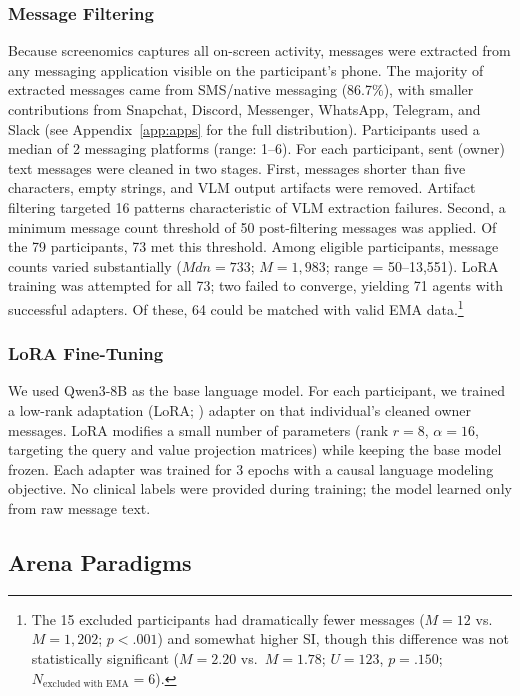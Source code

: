 \documentclass[review,12pt,authoryear]{elsarticle}
\begin{document}
\subsubsection{Message Filtering}

Because screenomics captures all on-screen activity, messages were extracted from any messaging application visible on the participant's phone. The majority of extracted messages came from SMS/native messaging (86.7\%), with smaller contributions from Snapchat, Discord, Messenger, WhatsApp, Telegram, and Slack (see Appendix~\ref{app:apps} for the full distribution). Participants used a median of 2 messaging platforms (range: 1--6). For each participant, sent (owner) text messages were cleaned in two stages. First, messages shorter than five characters, empty strings, and VLM output artifacts were removed. Artifact filtering targeted 16 patterns characteristic of VLM extraction failures. Second, a minimum message count threshold of 50 post-filtering messages was applied. Of the 79 participants, 73 met this threshold. Among eligible participants, message counts varied substantially ($Mdn = 733$; $M = 1{,}983$; range = 50--13,551). LoRA training was attempted for all 73; two failed to converge, yielding 71 agents with successful adapters. Of these, 64 could be matched with valid EMA data.\footnote{The 15 excluded participants had dramatically fewer messages ($M = 12$ vs.\ $M = 1{,}202$; $p < .001$) and somewhat higher SI, though this difference was not statistically significant ($M = 2.20$ vs.\ $M = 1.78$; $U = 123$, $p = .150$; $N_{\text{excluded with EMA}} = 6$).}

\subsubsection{LoRA Fine-Tuning}

We used Qwen3-8B \citep{qwen2025qwen3} as the base language model. For each participant, we trained a low-rank adaptation (LoRA; \citealt{hu2022lora}) adapter on that individual's cleaned owner messages. LoRA modifies a small number of parameters (rank $r = 8$, $\alpha = 16$, targeting the query and value projection matrices) while keeping the base model frozen. Each adapter was trained for 3 epochs with a causal language modeling objective. No clinical labels were provided during training; the model learned only from raw message text.

\subsection{Arena Paradigms}
\end{document}
